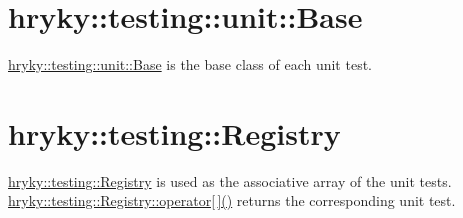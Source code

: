 \hypertarget{hryky_1_1testing_unit_test}{}\section{hryky\-::testing\-::unit\-::\-Base}\label{hryky_1_1testing_unit_test}
\hyperlink{classhryky_1_1testing_1_1unit_1_1_base}{hryky\-::testing\-::unit\-::\-Base} is the base class of each unit test.\hypertarget{hryky_1_1testing_registry}{}\section{hryky\-::testing\-::\-Registry}\label{hryky_1_1testing_registry}
\hyperlink{classhryky_1_1testing_1_1_registry}{hryky\-::testing\-::\-Registry} is used as the associative array of the unit tests. \hyperlink{classhryky_1_1testing_1_1_registry_aeed75a668cad923da49123e78153cac6}{hryky\-::testing\-::\-Registry\-::operator\mbox{[}$\,$\mbox{]}()} returns the corresponding unit test. 